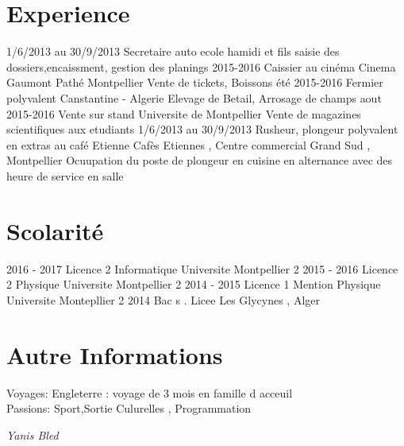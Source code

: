 \documentclass[]{friggeri-cv}
\begin{document}
\section{Experience}
\begin{entrylist}
  \entry
  {1/6/2013  au 30/9/2013}
  {Secretaire}
  {auto ecole hamidi et fils}
  {saisie des dossiers,encaissment, gestion des planings}
  \entry
    { 2015-2016}
    {Caissier au cinéma }
    {Cinema Gaumont Pathé Montpellier}
    {Vente de tickets, Boissons}
    \entry
    { été 2015-2016}
    {Fermier polyvalent}
    {Canstantine - Algerie}
    {Elevage de Betail, Arrosage de champs}
    \entry
    {aout  2015-2016}
    {Vente sur stand }
    {Universite de Montpellier }
    {Vente de magazines scientifiques aux etudiants}
    \entry
    { 1/6/2013  au 30/9/2013}
    {Rusheur, plongeur polyvalent en extras au café Etienne}
    {Cafès Etiennes , Centre commercial Grand Sud , Montpellier}
    {Ocuupation du poste de plongeur en cuisine en alternance avec des heure de service en salle }
\end{entrylist}

\section{Scolarité}
\begin{entrylist}
    \entry
    {2016 - 2017}
    {Licence 2 Informatique}
    {Universite Montpellier 2}
    {}
  \entry
    {2015 - 2016}
    {Licence 2 Physique}
    {Universite Montpellier 2}
    {}
  \entry
    {2014 - 2015}
    {Licence 1 Mention Physique }
    {Universite Montepllier 2 }
    {}
  \entry
    {2014}
    {Bac s    .}
    {Licee Les Glycynes , Alger}
    {}
\end{entrylist}

\section{Autre Informations}
Voyages: Engleterre : voyage de 3 mois en famille d acceuil\\
Passions: Sport,Sortie Culurelles , Programmation
\emph{}
\\
\begin{flushleft}
\end{flushleft}
\begin{flushright}
\emph{Yanis Bled}
\end{flushright}
\end{document}

